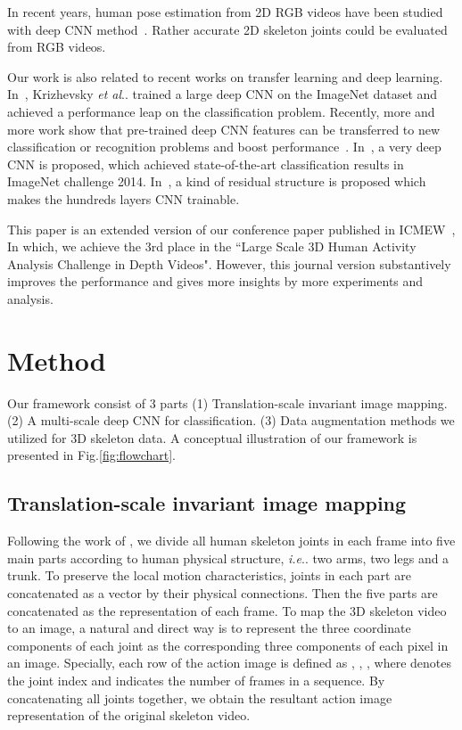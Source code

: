 \documentclass[10pt,journal]{IEEEtran}
\makeatletter
\DeclareRobustCommand\onedot{\futurelet\@let@token\@onedot}
\def\@onedot{\ifx\@let@token.\else.\null\fi\xspace}
\def\ie{\emph{i.e}\onedot} \def\Ie{\emph{I.e}\onedot}
\def\etal{\emph{et al}\onedot}
\makeatother
\begin{document}
In recent years, human pose estimation from 2D RGB videos have been studied with deep CNN method~\cite{Zhou2015Sparseness,Yang2016End,Toshev2013DeepPose}. Rather accurate 2D skeleton joints could be evaluated from RGB videos.

Our work is also related to recent works on transfer learning and deep learning. In~\cite{krizhevsky2012imagenet}, Krizhevsky \etal trained a large deep CNN on the ImageNet dataset and achieved a performance leap on the classification problem. Recently, more and more work show that pre-trained deep CNN features can be transferred to new classification or recognition problems and boost performance~\cite{Girshick2013Rich, oquab2013learning}. In~\cite{Simonyan2014Very}, a very deep CNN is proposed, which achieved state-of-the-art classification results in ImageNet challenge 2014. In~\cite{ResNet}, a kind of residual structure is proposed which makes the hundreds layers CNN trainable. 

This paper is an extended version of our conference paper published in ICMEW~\cite{}, In which, we achieve the 3rd place in the ``Large Scale 3D Human Activity Analysis Challenge in Depth Videos".  However, this journal version substantively improves the performance and gives more insights by more experiments and analysis.


\section{Method}\label{method}
Our framework consist of 3 parts (1) Translation-scale invariant image mapping. (2) A multi-scale deep CNN for classification. (3) Data augmentation methods we utilized for 3D skeleton data. A conceptual illustration of our framework is presented in Fig.\ref{fig:flowchart}.

\subsection{Translation-scale invariant image mapping}
Following the work of \cite{Yong2015Skeleton}, we divide all human skeleton joints in each frame into five main parts according to human physical structure, \ie two arms, two legs and a trunk. To preserve the local motion characteristics, joints in each part are concatenated as a vector by their physical connections. Then the five parts are concatenated as the representation of each frame. To map the 3D skeleton video to an image, a natural and direct way is to represent the three coordinate components  of each joint as the corresponding three components  of each pixel in an image. Specially, each row of the action image is defined as , , , where  denotes the joint index and  indicates the number of frames in a sequence. By concatenating all joints together, we obtain the resultant action image representation of the original skeleton video.
\end{document}
